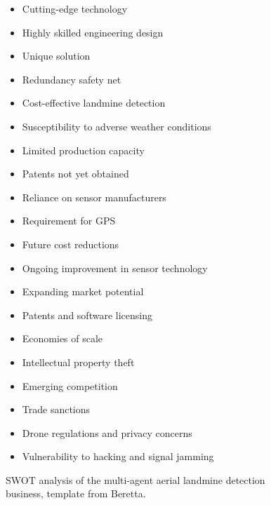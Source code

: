 \begin{figure}[H]
\centering
\begin{tcbraster}[raster columns=2, boxrule=0mm, arc=0mm]
\begin{tcolorbox}[equal height group=A, size=fbox, colback=swotS!60, colframe=swotS!80!black, title=\textsc{\textbf{STRENGTHS}}]
\begin{itemize}
    \item Cutting-edge technology
    \item Highly skilled engineering design
    \item Unique solution
    \item Redundancy safety net
    \item Cost-effective landmine detection
\end{itemize}
\end{tcolorbox}
\begin{tcolorbox}[equal height group=A, size=fbox, colback=swotW!60, colframe=swotW!80!black, title=\textsc{\textbf{WEAKNESSES}}]
\begin{itemize}
    \item Susceptibility to adverse weather conditions
    \item Limited production capacity
    \item Patents not yet obtained
    \item Reliance on sensor manufacturers
    \item Requirement for GPS
\end{itemize}
\end{tcolorbox}
\begin{tcolorbox}[equal height group=A, size=fbox, colback=swotO!60, colframe=swotO!80!black, title=\textsc{\textbf{OPPORTUNITIES}}]
\begin{itemize}
    \item Future cost reductions
    \item Ongoing improvement in sensor technology
    \item Expanding market potential
    \item Patents and software licensing
    \item Economies of scale
\end{itemize}
\end{tcolorbox}
\begin{tcolorbox}[equal height group=A, size=fbox, colback=swotT!60, colframe=swotT!80!black, title=\textsc{\textbf{THREATS}}]
\begin{itemize}
    \item Intellectual property theft
    \item Emerging competition
    \item Trade sanctions
    \item Drone regulations and privacy concerns
    \item Vulnerability to hacking and signal jamming
\end{itemize}
\end{tcolorbox}
\end{tcbraster}
\caption{SWOT analysis of the multi-agent aerial landmine detection business, template from Beretta.}
\label{fig:swot}
\end{figure}


